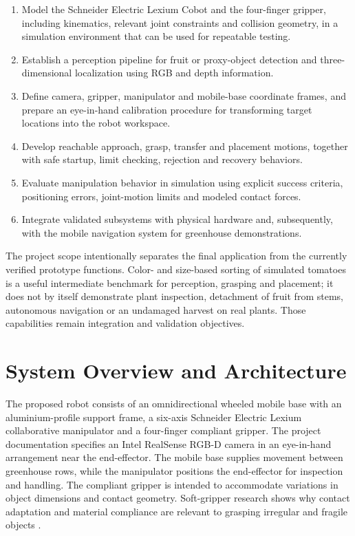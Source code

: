 \begin{enumerate}[label=\arabic*.]
 \item Model the Schneider Electric Lexium Cobot and the four-finger gripper, including
       kinematics, relevant joint constraints and collision geometry, in a simulation
       environment that can be used for repeatable testing.
 \item Establish a perception pipeline for fruit or proxy-object detection and
       three-dimensional localization using RGB and depth information.
 \item Define camera, gripper, manipulator and mobile-base coordinate frames, and
       prepare an eye-in-hand calibration procedure for transforming target locations
       into the robot workspace.
 \item Develop reachable approach, grasp, transfer and placement motions, together
       with safe startup, limit checking, rejection and recovery behaviors.
 \item Evaluate manipulation behavior in simulation using explicit success criteria,
       positioning errors, joint-motion limits and modeled contact forces.
 \item Integrate validated subsystems with physical hardware and, subsequently, with
       the mobile navigation system for greenhouse demonstrations.
\end{enumerate}

The project scope intentionally separates the final application from the currently
verified prototype functions. Color- and size-based sorting of simulated tomatoes is a
useful intermediate benchmark for perception, grasping and placement; it does not by
itself demonstrate plant inspection, detachment of fruit from stems, autonomous navigation
or an undamaged harvest on real plants. Those capabilities remain integration and
validation objectives.

\section{System Overview and Architecture}
\label{sec:architecture}

The proposed robot consists of an omnidirectional wheeled mobile base with an
aluminium-profile support frame, a six-axis Schneider Electric Lexium collaborative
manipulator and a four-finger compliant gripper. The project documentation specifies an
Intel RealSense RGB-D camera in an eye-in-hand arrangement near the end-effector. The
mobile base supplies movement between greenhouse rows, while the manipulator positions
the end-effector for inspection and handling. The compliant gripper is intended to
accommodate variations in object dimensions and contact geometry. Soft-gripper research
shows why contact adaptation and material compliance are relevant to grasping irregular
and fragile objects \cite{shintake2018}.

